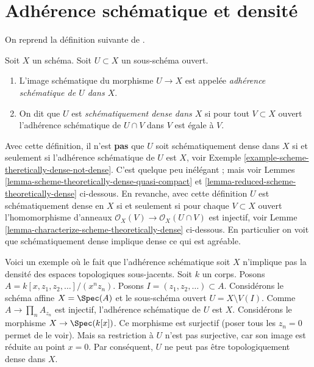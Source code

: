 \section{Adhérence schématique et densité}
\label{section-scheme-theoretic-closure}

\noindent
On reprend la définition suivante de \cite[IV, Définition 11.10.2]{EGA}.

\begin{definition}
\label{definition-scheme-theoretically-dense}
Soit $X$ un schéma. Soit $U \subset X$ un sous-schéma ouvert.
\begin{enumerate}
\item L'image schématique du morphisme $U \to X$ est appelée {\it
adhérence schématique de $U$ dans $X$}.
\item On dit que $U$ est {\it schématiquement dense dans
$X$} si pour tout $V \subset X$ ouvert l'adhérence schématique de $U \cap V$
dans $V$ est égale à $V$.
\end{enumerate}
\end{definition}

\noindent
Avec cette définition,
il n'est {\bf pas} que $U$ soit
schématiquement dense dans $X$ si et
seulement si l'adhérence schématique de $U$
est $X$, voir Exemple
\ref{example-scheme-theretically-dense-not-dense}. C'est quelque peu inélégant ; mais voir Lemmes
\ref{lemma-scheme-theoretically-dense-quasi-compact} et \ref{lemma-reduced-scheme-theoretically-dense} ci-dessous.
En revanche, avec cette définition $U$ est schématiquement
dense en $X$ si et seulement si pour chaque $V \subset X$
ouvert l'homomorphisme d'anneaux $\mathcal{O}_X(V) \to \mathcal{O}_X(U \cap V)$ est
injectif, voir Lemme \ref{lemma-characterize-scheme-theoretically-dense} ci-dessous. En
particulier on voit que schématiquement dense implique dense
ce qui est agréable.

\begin{example}
\label{example-scheme-theretically-dense-not-dense}
Voici un exemple où le fait que l'adhérence schématique soit $X$ n'implique
pas la densité des espaces topologiques sous-jacents.
Soit $k$
un corps. Posons $A = k[x, z_1, z_2, \ldots]/(x^n z_n)$.
Posons $I = (z_1, z_2, \ldots) \subset A$. Considérons le schéma
affine $X = \Spec(A)$ et le sous-schéma ouvert $U = X \setminus V(I)$.
Comme $A \to \prod_n A_{z_n}$ est injectif,
l'adhérence schématique de $U$ est $X$. Considérons
le morphisme $X \to \Spec(k[x])$. Ce morphisme
est surjectif (poser tous les $z_n = 0$ permet
de le voir). Mais sa restriction à $U$
n'est pas surjective, car son image est réduite
au point $x = 0$. Par conséquent, $U$ ne peut pas être topologiquement dense dans
$X$.
\end{example}

